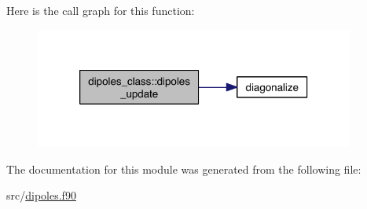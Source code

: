 Here is the call graph for this function\-:
\nopagebreak
\begin{figure}[H]
\begin{center}
\leavevmode
\includegraphics[width=298pt]{classdipoles__class_a9157bf14add87f3f26edfbc88c0da6fe_cgraph}
\end{center}
\end{figure}




The documentation for this module was generated from the following file\-:\begin{DoxyCompactItemize}
\item 
src/\hyperlink{dipoles_8f90}{dipoles.\-f90}\end{DoxyCompactItemize}
